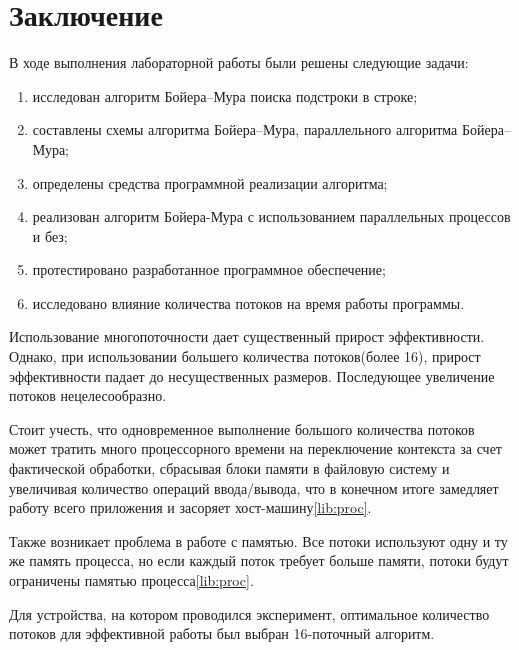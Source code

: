 \chapter*{Заключение}

В ходе выполнения лабораторной работы были решены следующие задачи:

\begin{enumerate}
	\item исследован алгоритм Бойера--Мура поиска подстроки в строке;
	\item составлены схемы алгоритма Бойера--Мура, параллельного алгоритма Бойера--Мура;
	\item определены средства программной реализации алгоритма;
	\item реализован алгоритм Бойера-Мура с использованием параллельных процессов и без;
	\item протестировано разработанное программное обеспечение;
	\item исследовано влияние количества потоков на время работы программы.
\end{enumerate}


Использование многопоточности дает существенный прирост эффективности. Однако, при использовании большего количества потоков(более 16), прирост эффективности падает до несущественных размеров. Последующее увеличение потоков нецелесообразно. 


Стоит учесть, что одновременное выполнение большого количества потоков может тратить много процессорного времени на переключение контекста за счет фактической обработки, сбрасывая блоки памяти в файловую систему и увеличивая количество операций ввода/вывода, что в конечном итоге замедляет работу всего приложения и засоряет хост-машину\ref{lib:proc}.


Также возникает проблема в работе с памятью. Все потоки используют одну и ту же память процесса, но если каждый поток требует больше памяти, потоки будут ограничены памятью процесса\ref{lib:proc}. 


Для устройства, на котором проводился эксперимент, оптимальное количество потоков для эффективной работы был выбран 16-поточный алгоритм.